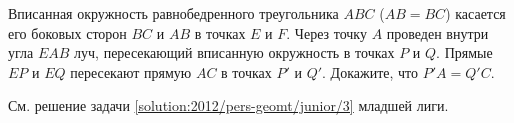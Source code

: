 Вписанная окружность равнобедренного треугольника $ABC$ ($AB = BC$) касается
его боковых сторон $BC$ и $AB$ в точках $E$ и $F$.
Через точку $A$ проведен внутри угла $EAB$ луч, пересекающий вписанную
окружность в точках $P$ и $Q$.
Прямые $EP$ и $EQ$ пересекают прямую $AC$ в точках $P'$ и $Q'$.
Докажите, что $P'A = Q'C$.

\solution
См. решение задачи \ref{solution:2012/pers-geomt/junior/3} младшей лиги.

